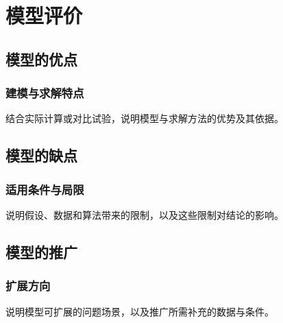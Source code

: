 \section{模型评价}
\label{sec:evaluation}

\subsection{模型的优点}
\subsubsection{建模与求解特点}
结合实际计算或对比试验，说明模型与求解方法的优势及其依据。

\subsection{模型的缺点}
\subsubsection{适用条件与局限}
说明假设、数据和算法带来的限制，以及这些限制对结论的影响。

\subsection{模型的推广}
\subsubsection{扩展方向}
说明模型可扩展的问题场景，以及推广所需补充的数据与条件。
